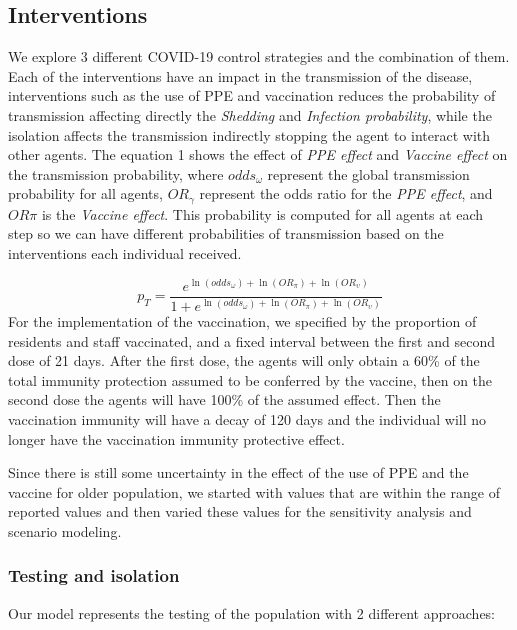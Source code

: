 \documentclass[
]{article}
\begin{document}
\hypertarget{interventions}{%
\subsection{Interventions}\label{interventions}}

We explore 3 different COVID-19 control strategies and the combination
of them. Each of the interventions have an impact in the transmission of
the disease, interventions such as the use of PPE and vaccination
reduces the probability of transmission affecting directly the
\emph{Shedding} and \emph{Infection probability}, while the isolation
affects the transmission indirectly stopping the agent to interact with
other agents. The equation 1 shows the effect of \emph{PPE effect} and
\emph{Vaccine effect} on the transmission probability, where
\(odds_\omega\) represent the global transmission probability for all
agents, \(OR_\gamma\) represent the odds ratio for the \emph{PPE
effect}, and \(OR\pi\) is the \emph{Vaccine effect}. This probability is
computed for all agents at each step so we can have different
probabilities of transmission based on the interventions each individual
received.

\[p_T = \frac{e^{\ln(odds_\omega) + \ln(OR_\pi)+ \ln(OR_\upsilon)}}{1 + e^{\ln(odds_\omega) + \ln(OR_\pi)+ \ln(OR_\upsilon)}}\]
For the implementation of the vaccination, we specified by the
proportion of residents and staff vaccinated, and a fixed interval
between the first and second dose of 21 days. After the first dose, the
agents will only obtain a 60\% of the total immunity protection assumed
to be conferred by the vaccine, then on the second dose the agents will
have 100\% of the assumed effect. Then the vaccination immunity will
have a decay of 120 days and the individual will no longer have the
vaccination immunity protective effect.

Since there is still some uncertainty in the effect of the use of PPE
and the vaccine for older population, we started with values that are
within the range of reported values and then varied these values for the
sensitivity analysis and scenario modeling.

\hypertarget{testing-and-isolation}{%
\subsubsection{Testing and isolation}\label{testing-and-isolation}}

Our model represents the testing of the population with 2 different
approaches:
\end{document}
